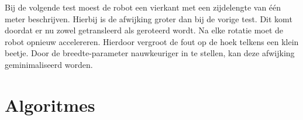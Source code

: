 \documentclass[tt1]{penoverslag}
\begin{document}
Bij de volgende test moest de robot een vierkant met een zijdelengte van één meter beschrijven. Hierbij is de afwijking groter dan bij de vorige test. Dit komt doordat er nu zowel getransleerd als geroteerd wordt. Na elke rotatie moet de robot opnieuw accelereren. Hierdoor vergroot de fout op de hoek telkens een klein beetje. Door de breedte-parameter nauwkeuriger in te stellen, kan deze afwijking geminimaliseerd worden.%


\section{Algoritmes}




\end{document}
